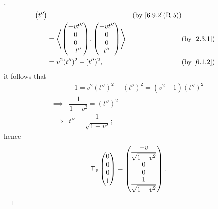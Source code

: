 \begin{proof}[]
\begin{align*}
{\begin{pmatrix}
                                                                         t''
                                                                       \end{pmatrix}}     &  & \by{6.9.2}[R 5]             \\
                                         & = \inn{\begin{pmatrix}
                                                      -v t'' \\
                                                      0      \\
                                                      0      \\
                                                      -t''
                                                    \end{pmatrix}, \begin{pmatrix}
                                                                     -v t'' \\
                                                                     0      \\
                                                                     0      \\
                                                                     t''
                                                                   \end{pmatrix}}     &  & \by{2.3.1}                      \\
                                         & =  v^2 (t'')^2 - (t'')^2,          &  & \by{6.1.2}
  \end{align*}
  it follows that
  \begin{align*}
             & -1 = v^2 (t'')^2 - (t'')^2 = (v^2 - 1) (t'')^2 \\
    \implies & \dfrac{1}{1 - v^2} = (t'')^2                   \\
    \implies & t'' = \dfrac{1}{\sqrt{1 - v^2}};
  \end{align*}
  hence
  \[
    \mathsf{T}_v\begin{pmatrix}
      0 \\
      0 \\
      0 \\
      1
    \end{pmatrix} = \begin{pmatrix}
      \dfrac{-v}{\sqrt{1 - v^2}} \\
      0                          \\
      0                          \\
      \dfrac{1}{\sqrt{1 - v^2}}
    \end{pmatrix}.
  \]


\end{proof}
